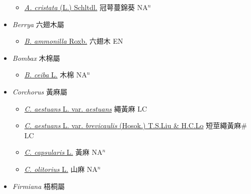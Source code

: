 \begin{itemize}
  \begin{itemize}
        \item[] \href{http://www.theplantlist.org/tpl1.1/search?q=Anoda+cristata}{\textit{A. cristata} (L.) Schltdl.}   冠萼蔓錦葵 NA$^n$
  \end{itemize}
 \item[] \textit{Berrya} 六翅木屬
                    
  \begin{itemize}
        \item[] \href{http://www.theplantlist.org/tpl1.1/search?q=Berrya+ammonilla}{\textit{B. ammonilla} Roxb.}   六翅木 EN
  \end{itemize}
 \item[] \textit{Bombax} 木棉屬
                    
  \begin{itemize}
        \item[] \href{http://www.theplantlist.org/tpl1.1/search?q=Bombax+ceiba}{\textit{B. ceiba} L.}     木棉 NA$^n$
  \end{itemize}
 \item[] \textit{Corchorus} 黃麻屬
                    
  \begin{itemize}
        \item[] \href{http://www.theplantlist.org/tpl1.1/search?q=Corchorus+aestuans+var.+aestuans}{\textit{C. aestuans} L. var. \textit{aestuans}}   繩黃麻 LC
        \item[] \href{http://www.theplantlist.org/tpl1.1/search?q=Corchorus+aestuans+var.+brevicaulis}{\textit{C. aestuans} L. var. \textit{brevicaulis} (Hosok.) T.S.Liu \& H.C.Lo}   短莖繩黃麻\# LC
        \item[] \href{http://www.theplantlist.org/tpl1.1/search?q=Corchorus+capsularis}{\textit{C. capsularis} L.}   黃麻 NA$^n$
        \item[] \href{http://www.theplantlist.org/tpl1.1/search?q=Corchorus+olitorius}{\textit{C. olitorius} L.}   山麻 NA$^n$
  \end{itemize}
 \item[] \textit{Firmiana} 梧桐屬
                    

\end{itemize}
